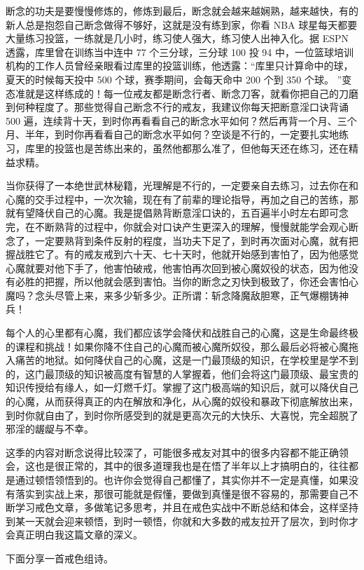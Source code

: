 断念的功夫是要慢慢修炼的，修炼到最后，断念就会越来越娴熟，越来越快，有的新人总是抱怨自己断念做得不够好，这就是没有练到家，你看 NBA 球星每天都要大量练习投篮，一练就是几小时，练习使人强大，练习使人出神入化。据 ESPN 透露，库里曾在训练当中连中 77 个三分球，三分球 100 投 94 中，一位篮球培训机构的工作人员曾经亲眼看过库里的投篮训练，他透露：“库里只计算命中的球，夏天的时候每天投中 500 个球，赛季期间，会每天命中 200 个到 350 个球。 ”变态准就是这样练成的！每一位戒友都是断念行者、断念刀客，就看你把自己的刀磨到何种程度了。那些觉得自己断念不行的戒友，我建议你每天把断意淫口诀背诵 500 遍，连续背十天，到时你再看看自己的断念水平如何？然后再背一个月、三个月、半年，到时你再看看自己的断念水平如何？空谈是不行的，一定要扎实地练习，库里的投篮也是苦练出来的，虽然他都那么准了，但他每天还在练习，还在精益求精。

当你获得了一本绝世武林秘籍，光理解是不行的，一定要亲自去练习，过去你在和心魔的交手过程中，一次次输，现在有了前辈的理论指导，再加之自己的苦练，那就有望降伏自己的心魔。我是提倡熟背断意淫口诀的，五百遍半小时左右即可念完，在不断熟背的过程中，你就会对口诀产生更深入的理解，慢慢就能学会观心断念了，一定要熟背到条件反射的程度，当功夫下足了，到时再次面对心魔，就有把握战胜它了。有的戒友戒到六十天、七十天时，他就开始感到害怕了，因为他感觉心魔就要对他下手了，他害怕破戒，他害怕再次回到被心魔奴役的状态，因为他没有必胜的把握，所以他就会感到害怕。当你的断念之刃快到极致了，你还会害怕心魔吗？念头尽管上来，来多少斩多少。正所谓：斩念降魔敌胆寒，正气爆棚铸神兵！

每个人的心里都有心魔，我们都应该学会降伏和战胜自己的心魔，这是生命最终极的课程和挑战！如果你降不住自己的心魔而被心魔所奴役，那么最后必将被心魔拖入痛苦的地狱。如何降伏自己的心魔，这是一门最顶级的知识，在学校里是学不到的，这门最顶级的知识被高度有智慧的人掌握着，他们会将这门最顶级、最宝贵的知识传授给有缘人，如一灯燃千灯。掌握了这门极高端的知识后，就可以降伏自己的心魔，从而获得真正的内在解放和净化，从心魔的奴役和暴政下彻底解放出来，到时你就自由了，到时你所感受到的就是更高次元的大快乐、大喜悦，完全超脱了邪淫的龌龊与不幸。

这季的内容对断念说得比较深了，可能很多戒友对其中的很多内容都不能正确领会，这也是很正常的，其中的很多道理我也是在悟了半年以上才搞明白的，往往都是通过顿悟领悟到的。也许你会觉得自己都懂了，其实你并不一定是真懂，如果没有落实到实战上来，那很可能就是假懂，要做到真懂是很不容易的，那需要自己不断学习戒色文章，多做笔记多思考，并且在戒色实战中不断总结和体会，这样坚持到某一天就会迎来顿悟，到时一顿悟，你就和大多数的戒友拉开了层次，到时你才会真正明白我这篇文章的深义。

下面分享一首戒色组诗。

